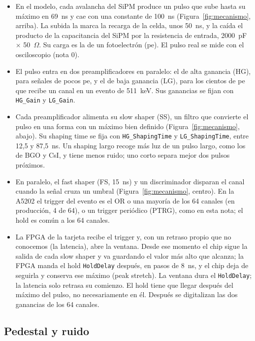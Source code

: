 \documentclass[11pt,a4paper]{article}
\begin{document}
\begin{itemize}
\item En el modelo, cada avalancha del SiPM produce un pulso que sube hasta su máximo en
  69~ns y cae con una constante de 100~ns (Figura~\ref{fig:mecanismo},
  arriba). La subida la marca la recarga de la celda, unos 50~ns, y la
  caída el producto de la capacitancia del SiPM por la resistencia de
  entrada, 2000~pF $\times$ 50~$\Omega$. Su carga es la de un fotoelectrón
  (pe). El pulso real se mide con el osciloscopio (nota 0).
\item El pulso entra en dos preamplificadores en paralelo: el de alta
  ganancia (HG), para señales de pocos pe, y el de baja ganancia (LG), para
  los cientos de pe que recibe un canal en un evento de 511~keV. Sus
  ganancias se fijan con \texttt{HG\_Gain} y \texttt{LG\_Gain}.
\item Cada preamplificador alimenta su slow shaper (SS), un filtro que
  convierte el pulso en una forma con un máximo bien definido
  (Figura~\ref{fig:mecanismo}, abajo). Su shaping time se fija con
  \texttt{HG\_ShapingTime} y \texttt{LG\_ShapingTime}, entre 12,5 y
  87,5~ns. Un shaping largo recoge más luz de un pulso largo, como los de
  BGO y CsI, y tiene menos ruido; uno corto separa mejor dos pulsos
  próximos.
\item En paralelo, el fast shaper (FS, 15~ns) y un discriminador disparan el
  canal cuando la señal cruza un umbral (Figura~\ref{fig:mecanismo},
  centro). En la A5202 el trigger del evento es el OR o una mayoría de
  los 64 canales (en producción, 4 de 64), o un trigger periódico (PTRG),
  como en esta nota; el hold es común a los 64
  canales.
\item La FPGA de la tarjeta recibe el trigger y, con un retraso propio que
  no conocemos (la latencia), abre la ventana. Desde ese momento el chip
  sigue la salida de cada slow shaper y va guardando el valor más alto que
  alcanza; la FPGA manda el hold \texttt{HoldDelay} después, en pasos de
  8~ns, y el chip deja de seguirla y conserva ese máximo (peak stretch). La
  ventana dura el \texttt{HoldDelay}; la latencia solo retrasa su comienzo.
  El hold tiene que llegar después del máximo del pulso, no necesariamente
  en él. Después se digitalizan las dos ganancias de los 64 canales.
\end{itemize}

\subsection*{Pedestal y ruido}
\end{document}
